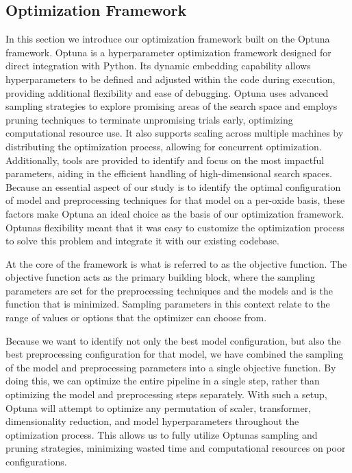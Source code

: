 \subsection{Optimization Framework}\label{sec:optimization-framework}
In this section we introduce our optimization framework built on the Optuna framework.
Optuna is a hyperparameter optimization framework designed for direct integration with Python. Its dynamic embedding capability allows hyperparameters to be defined and adjusted within the code during execution, providing additional flexibility and ease of debugging. 
Optuna uses advanced sampling strategies to explore promising areas of the search space and employs pruning techniques to terminate unpromising trials early, optimizing computational resource use. 
It also supports scaling across multiple machines by distributing the optimization process, allowing for concurrent optimization. 
Additionally, tools are provided to identify and focus on the most impactful parameters, aiding in the efficient handling of high-dimensional search spaces. \cite{optuna_2019} 
Because an essential aspect of our study is to identify the optimal configuration of model and preprocessing techniques for that model on a per-oxide basis, these factors make Optuna an ideal choice as the basis of our optimization framework.
Optunas flexibility meant that it was easy to customize the optimization process to solve this problem and integrate it with our existing codebase.

At the core of the framework is what is referred to as the objective function.
The objective function acts as the primary building block, where the sampling parameters are set for the preprocessing techniques and the models and is the function that is minimized.
Sampling parameters in this context relate to the range of values or options that the optimizer can choose from.

Because we want to identify not only the best model configuration, but also the best preprocessing configuration for that model, we have combined the sampling of the model and preprocessing parameters into a single objective function.
By doing this, we can optimize the entire pipeline in a single step, rather than optimizing the model and preprocessing steps separately.
With such a setup, Optuna will attempt to optimize any permutation of scaler, transformer, dimensionality reduction, and model hyperparameters throughout the optimization process.
This allows us to fully utilize Optunas sampling and pruning strategies, minimizing wasted time and computational resources on poor configurations.

